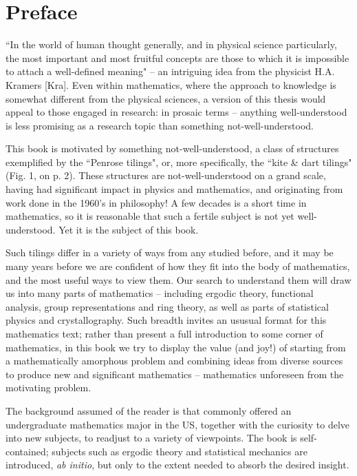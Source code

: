 \documentclass[reqno]{stml-l}
\theoremstyle{plain}
\theoremstyle{definition}
\numberwithin{equation}{chapter}
\begin{document}
\frontmatter

\tableofcontents
\listoffigures

\chapter*{Preface}

``In the world of human thought generally, and in physical science particularly, the most important and most fruitful concepts are those to which it is impossible to attach a well-defined meaning" -- an intriguing idea from the physicist H.A. Kramers [Kra]. Even within mathematics, where the approach to knowledge is somewhat different from the physical sciences, a version of this thesis would appeal to those engaged in research: in prosaic terms -- anything well-understood is less promising as a research topic than something not-well-understood.

This book is motivated by something not-well-understood, a class of structures exemplified by the ``Penrose tilings", or, more specifically, the ``kite \& dart tilings" (Fig. 1, on p. 2). These structures are not-well-understood on a grand scale, having had significant impact in physics and mathematics, and originating from work done in the 1960's in philosophy! A few decades is a short time in mathematics, so it is reasonable that such a fertile subject is not yet well-understood. Yet it is the subject of this book.

Such tilings differ in a variety of ways from any studied before, and it may be many years before we are confident of how they fit into the body of mathematics, and the most useful ways to view them. Our search to understand them will draw us into many parts of mathematics -- including ergodic theory, functional analysis, group representations and ring theory, as well as parts of statistical physics and crystallography. Such breadth invites an ususual format for this mathematics text; rather than present a full introduction to some corner of mathematics, in this book we try to display the value (and joy!) of starting from a mathematically amorphous problem and combining ideas from diverse sources to produce new and significant mathematics -- mathematics unforeseen from the motivating problem.

The background assumed of the reader is that commonly offered an undergraduate mathematics major in the US, together with the curiosity to delve into new subjects, to readjust to a variety of viewpoints. The book is self-contained; subjects such as ergodic theory and statistical mechanics are introduced, \emph{ab initio}, but only to the extent needed to absorb the desired insight.
\end{document}
